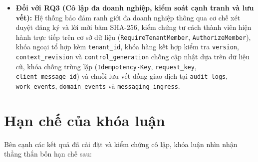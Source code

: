 \begin{itemize}
  \item \textbf{Đối với RQ3 (Cô lập đa doanh nghiệp, kiểm soát cạnh tranh và lưu vết):} Hệ thống bảo đảm ranh giới đa doanh nghiệp thông qua cơ chế xét duyệt đăng ký và lời mời băm SHA-256, kiểm chứng tư cách thành viên hiện hành trực tiếp trên cơ sở dữ liệu (\texttt{Require\hspace{0pt}Tenant\hspace{0pt}Member}, \texttt{Authorize\hspace{0pt}Member}), khóa ngoại tổ hợp kèm \texttt{tenant\_\hspace{0pt}id}, khóa hàng kết hợp kiểm tra \texttt{version}, \texttt{context\_\hspace{0pt}revision} và \texttt{control\_\hspace{0pt}generation} chống cập nhật dựa trên dữ liệu cũ, khóa chống trùng lặp (\texttt{Idempotency-\hspace{0pt}Key}, \texttt{request\_\hspace{0pt}key}, \texttt{client\_\hspace{0pt}message\_\hspace{0pt}id}) và chuỗi lưu vết đồng giao dịch tại \texttt{audit\_\hspace{0pt}logs}, \texttt{work\_\hspace{0pt}events}, \texttt{domain\_\hspace{0pt}events} và \texttt{messaging\_\hspace{0pt}ingress}.
\end{itemize}

\section{Hạn chế của khóa luận}
Bên cạnh các kết quả đã cài đặt và kiểm chứng cô lập, khóa luận nhìn nhận thẳng thắn bốn hạn chế sau:

